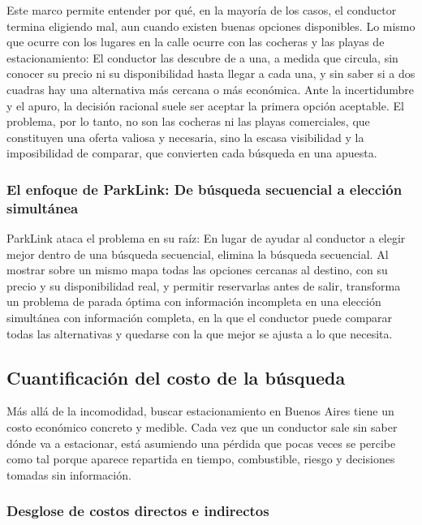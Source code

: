 Este marco permite entender por qué, en la mayoría de los casos, el conductor termina eligiendo mal, aun cuando existen buenas opciones disponibles. Lo mismo que ocurre con los lugares en la calle ocurre con las cocheras y las playas de estacionamiento: El conductor las descubre de a una, a medida que circula, sin conocer su precio ni su disponibilidad hasta llegar a cada una, y sin saber si a dos cuadras hay una alternativa más cercana o más económica. Ante la incertidumbre y el apuro, la decisión racional suele ser aceptar la primera opción aceptable. El problema, por lo tanto, no son las cocheras ni las playas comerciales, que constituyen una oferta valiosa y necesaria, sino la escasa visibilidad y la imposibilidad de comparar, que convierten cada búsqueda en una apuesta.

\subsubsection{El enfoque de ParkLink: De búsqueda secuencial a elección simultánea}

ParkLink ataca el problema en su raíz: En lugar de ayudar al conductor a elegir mejor dentro de una búsqueda secuencial, elimina la búsqueda secuencial. Al mostrar sobre un mismo mapa todas las opciones cercanas al destino, con su precio y su disponibilidad real, y permitir reservarlas antes de salir, transforma un problema de parada óptima con información incompleta en una elección simultánea con información completa, en la que el conductor puede comparar todas las alternativas y quedarse con la que mejor se ajusta a lo que necesita.

\subsection{Cuantificación del costo de la búsqueda}

Más allá de la incomodidad, buscar estacionamiento en Buenos Aires tiene un costo económico concreto y medible. Cada vez que un conductor sale sin saber dónde va a estacionar, está asumiendo una pérdida que pocas veces se percibe como tal porque aparece repartida en tiempo, combustible, riesgo y decisiones tomadas sin información.

\subsubsection{Desglose de costos directos e indirectos}


